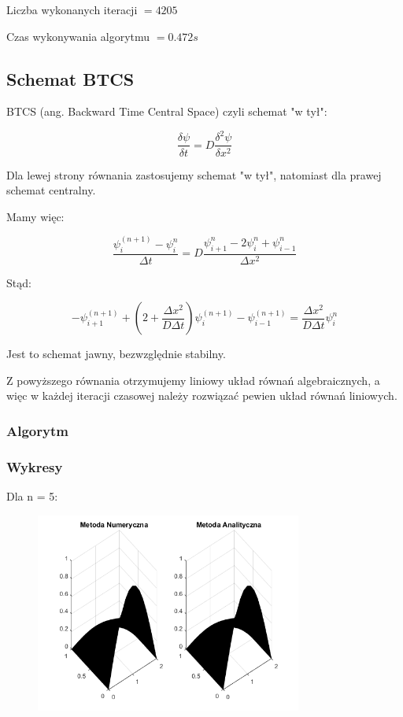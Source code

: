 Liczba wykonanych iteracji $ = 4205 $

Czas wykonywania algorytmu $ = 0.472 s$
\newpage
\subsection{Schemat BTCS}
BTCS (ang. Backward Time Central Space) czyli schemat "w tył":

$$\dfrac{\delta \psi}{\delta t} = D\dfrac{\delta^2 \psi}{\delta x^2}$$

Dla lewej strony równania zastosujemy schemat "w tył", natomiast dla prawej schemat centralny.

Mamy więc:

$$\dfrac{\psi^{(n+1)}_{i}-\psi^n_{i}}{\Delta t}=D\dfrac{\psi^{n}_{i+1}-2\psi^n_{i}+\psi^n_{i-1}}{\Delta x^2}$$

Stąd:

$$-\psi^{(n+1)}_{i+1} + \left(2+\dfrac{\Delta x^2}{D \Delta t}\right) \psi^{(n+1)}_{i} -\psi^{(n+1)}_{i-1} =\dfrac{\Delta x^2}{D\Delta t}\psi^{n}_{i}$$

Jest to schemat jawny, bezwzględnie stabilny. 

Z powyższego równania otrzymujemy liniowy układ równań algebraicznych, a więc w każdej iteracji czasowej należy rozwiązać pewien układ równań liniowych.
\newpage
\subsubsection{Algorytm}

\newpage
\subsubsection{Wykresy}

Dla n = 5:

\begin{figure}[!ht]
	\begin{center}
		\includegraphics[width=0.78\textwidth]{Lab7/charts/btcs/5.png}
	\end{center}
\end{figure}

